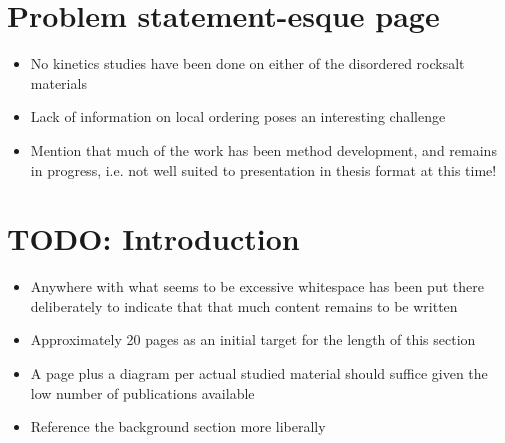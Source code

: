 \section{Problem statement-esque page}
\begin{itemize}
	\item No kinetics studies have been done on either of the disordered rocksalt materials
	\item Lack of information on local ordering poses an interesting challenge
	\item Mention that much of the work has been method development, and remains in progress, i.e. not well suited to presentation in thesis format at this time!
\end{itemize}

\newpage
\section{TODO: Introduction}
\begin{itemize}
	\item Anywhere with what seems to be excessive whitespace has been put there deliberately to indicate that that much content remains to be written
	\item Approximately 20 pages as an initial target for the length of this section
	\item A page plus a diagram per actual studied material should suffice given the low number of publications available
	\item Reference the background section more liberally
\end{itemize}


